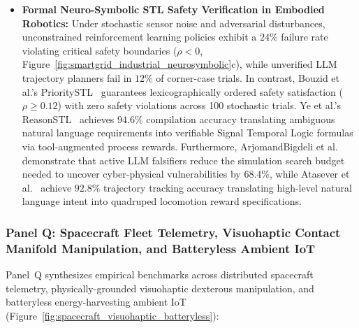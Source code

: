 \begin{itemize}
    \item \textbf{Formal Neuro-Symbolic STL Safety Verification in Embodied Robotics:} Under stochastic sensor noise and adversarial disturbances, unconstrained reinforcement learning policies exhibit a $24\%$ failure rate violating critical safety boundaries ($\rho < 0$, Figure~\ref{fig:smartgrid_industrial_neurosymbolic}c), while unverified LLM trajectory planners fail in $12\%$ of corner-case trials. In contrast, Bouzid et al.'s PrioritySTL~\cite{Bouzid2026PrioritySTL} guarantees lexicographically ordered safety satisfaction ($\rho \ge 0.12$) with zero safety violations across 100 stochastic trials. Ye et al.'s ReasonSTL~\cite{Ye2026ReasonSTL} achieves $94.6\%$ compilation accuracy translating ambiguous natural language requirements into verifiable Signal Temporal Logic formulas via tool-augmented process rewards. Furthermore, ArjomandBigdeli et al.~\cite{Bigdeli2026LLMFalsifier} demonstrate that active LLM falsifiers reduce the simulation search budget needed to uncover cyber-physical vulnerabilities by $68.4\%$, while Atasever et al.~\cite{Atasever2026LLMSpec} achieve $92.8\%$ trajectory tracking accuracy translating high-level natural language intent into quadruped locomotion reward specifications.
\end{itemize}

\subsubsection{Panel Q: Spacecraft Fleet Telemetry, Visuohaptic Contact Manifold Manipulation, and Batteryless Ambient IoT}
\label{sec:panel_q}

Panel~Q synthesizes empirical benchmarks across distributed spacecraft telemetry, physically-grounded visuohaptic dexterous manipulation, and batteryless energy-harvesting ambient IoT (Figure~\ref{fig:spacecraft_visuohaptic_batteryless}):

